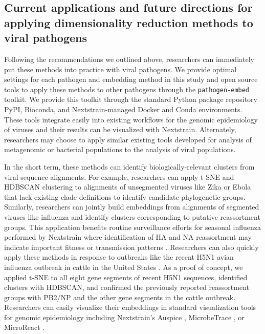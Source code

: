 \documentclass[webpdf,contemporary,large,single]{oup-authoring-template}%
\theoremstyle{thmstyleone}%
\theoremstyle{thmstyletwo}%
\theoremstyle{thmstylethree}%
\begin{document}
\subsection{Current applications and future directions for applying dimensionality reduction methods to viral pathogens}

Following the recommendations we outlined above, researchers can immediately put these methods into practice with viral pathogens.
We provide optimal settings for each pathogen and embedding method in this study and open source tools to apply these methods to other pathogens through the \texttt{pathogen-embed} toolkit.
We provide this toolkit through the standard Python package repository PyPI, Bioconda, and Nextstrain-managed Docker and Conda environments.
These tools integrate easily into existing workflows for the genomic epidemiology of viruses and their results can be visualized with Nextstrain.
Alternately, researchers may choose to apply similar existing tools developed for analysis of metagenomic or bacterial populations \citep{Schloss2009,Schloss2020,Bolyen2019,McMurdie2013,Lees2019} to the analysis of viral populations.

In the short term, these methods can identify biologically-relevant clusters from viral sequence alignments.
For example, researchers can apply t-SNE and HDBSCAN clustering to alignments of unsegmented viruses like Zika or Ebola that lack existing clade definitions to identify candidate phylogenetic groups.
Similarly, researchers can jointly build embeddings from alignments of segmented viruses like influenza and identify clusters corresponding to putative reassortment groups.
This application benefits routine surveillance efforts for seasonal influenza performed by Nextstrain where identification of HA and NA reassortment may indicate important fitness or transmission patterns \citep{Huddleston2024}.
Researchers can also quickly apply these methods in response to outbreaks like the recent H5N1 avian influenza outbreak in cattle in the United States \citep{Nguyen2024}.
As a proof of concept, we applied t-SNE to all eight gene segments of recent H5N1 sequences, identified clusters with HDBSCAN, and confirmed the previously reported reassortment groups with PB2/NP and the other gene segments in the cattle outbreak.
Researchers can easily visualize their embeddings in standard visualization tools for genomic epidemiology including Nextstrain's Auspice \citep{Hadfield2018}, MicrobeTrace \citep{Campbell2021}, or MicroReact \citep{Argimon2016}.
\end{document}
